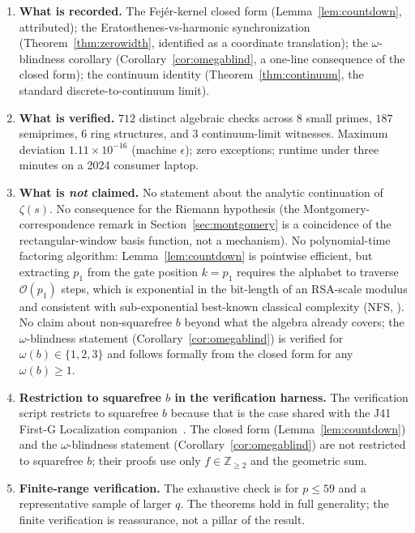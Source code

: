 \documentclass[11pt,reqno]{amsart}
\theoremstyle{plain}
\theoremstyle{definition}
\theoremstyle{remark}
\newcommand{\Z}{\mathbb{Z}}
\newcommand{\bigO}{\mathcal{O}}
\begin{document}
\begin{enumerate}[label={\upshape(\arabic*)}]
\item \textbf{What is recorded.} The Fej\'er-kernel closed form
(Lemma~\ref{lem:countdown}, attributed); the
Eratosthenes-vs-harmonic synchronization
(Theorem~\ref{thm:zerowidth}, identified as a coordinate
translation); the $\omega$-blindness corollary
(Corollary~\ref{cor:omegablind}, a one-line consequence of the
closed form); the continuum identity
(Theorem~\ref{thm:continuum}, the standard discrete-to-continuum
limit).

\item \textbf{What is verified.} $712$ distinct algebraic checks
across $8$ small primes, $187$ semiprimes, $6$ ring structures,
and $3$ continuum-limit witnesses. Maximum deviation
$1.11 \times 10^{-16}$ (machine $\epsilon$); zero exceptions;
runtime under three minutes on a 2024 consumer laptop.

\item \textbf{What is \emph{not} claimed.} No statement about
the analytic continuation of $\zeta(s)$. No consequence for the
Riemann hypothesis (the Montgomery-correspondence remark in
Section~\ref{sec:montgomery} is a coincidence of the
rectangular-window basis function, not a mechanism). No
polynomial-time factoring algorithm: Lemma~\ref{lem:countdown}
is pointwise efficient, but extracting $p_1$ from the gate
position $k = p_1$ requires the alphabet to traverse
$\bigO(p_1)$ steps, which is exponential in the bit-length of
an RSA-scale modulus and consistent with sub-exponential
best-known classical complexity (NFS,
\cite{LenstraEtAl1993}). No claim about non-squarefree $b$
beyond what the algebra already covers; the
$\omega$-blindness statement
(Corollary~\ref{cor:omegablind}) is verified for
$\omega(b) \in \{1, 2, 3\}$ and follows formally from the
closed form for any $\omega(b) \ge 1$.

\item \textbf{Restriction to squarefree $b$ in the verification
harness.} The verification script restricts to squarefree $b$
because that is the case shared with the J41 First-G
Localization companion~\cite{J04Sanders}. The closed form
(Lemma~\ref{lem:countdown}) and the $\omega$-blindness
statement (Corollary~\ref{cor:omegablind}) are not restricted
to squarefree $b$; their proofs use only $f \in \Z_{\ge 2}$
and the geometric sum.

\item \textbf{Finite-range verification.} The exhaustive check is
for $p \le 59$ and a representative sample of larger $q$. The
theorems hold in full generality; the finite verification is
reassurance, not a pillar of the result.
\end{enumerate}
\end{document}
